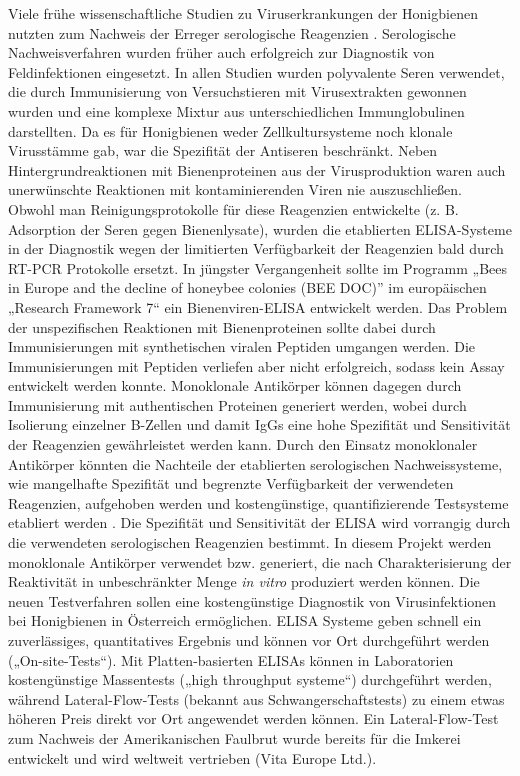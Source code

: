 Viele frühe wissenschaftliche Studien zu Viruserkrankungen der Honigbienen nutzten zum Nachweis der Erreger serologische Reagenzien \citep{Anderson1984}. Serologische Nachweisverfahren wurden früher auch erfolgreich zur Diagnostik von Feldinfektionen eingesetzt. In allen Studien wurden polyvalente Seren verwendet, die durch Immunisierung von Versuchstieren mit Virusextrakten gewonnen wurden und eine komplexe Mixtur aus unterschiedlichen Immunglobulinen darstellten. Da es für Honigbienen weder Zellkultursysteme noch klonale Virusstämme gab, war die Spezifität der Antiseren beschränkt. Neben Hintergrundreaktionen mit Bienenproteinen aus der Virusproduktion waren auch unerwünschte Reaktionen mit kontaminierenden Viren nie auszuschließen. Obwohl man Reinigungsprotokolle für diese Reagenzien entwickelte (z. B. Adsorption der Seren gegen Bienenlysate), wurden die etablierten ELISA-Systeme in der Diagnostik wegen der limitierten Verfügbarkeit der Reagenzien bald durch RT-PCR Protokolle ersetzt. In jüngster Vergangenheit sollte im Programm „Bees in Europe and the decline of honeybee colonies (BEE DOC)” im europäischen „Research Framework 7“ ein Bienenviren-ELISA entwickelt werden. Das Problem der unspezifischen Reaktionen mit Bienenproteinen sollte dabei durch Immunisierungen mit synthetischen viralen Peptiden umgangen werden. Die Immunisierungen mit Peptiden verliefen aber nicht erfolgreich, sodass kein Assay entwickelt werden konnte. Monoklonale Antikörper können dagegen durch Immunisierung mit authentischen Proteinen generiert werden, wobei durch Isolierung einzelner B-Zellen und damit IgGs eine hohe Spezifität und Sensitivität der Reagenzien gewährleistet werden kann. Durch den Einsatz monoklonaler Antikörper könnten die Nachteile der etablierten serologischen Nachweissysteme, wie mangelhafte Spezifität und begrenzte Verfügbarkeit der verwendeten Reagenzien, aufgehoben werden und kostengünstige, quantifizierende Testsysteme etabliert werden \citep{Usuda1999}.
Die Spezifität und Sensitivität der ELISA wird vorrangig durch die verwendeten serologischen Reagenzien bestimmt. In diesem Projekt werden monoklonale Antikörper verwendet bzw. generiert, die nach Charakterisierung der Reaktivität in unbeschränkter Menge \textit{in vitro} produziert werden können. Die neuen Testverfahren sollen eine kostengünstige Diagnostik von Virusinfektionen bei Honigbienen in Österreich ermöglichen. ELISA Systeme geben schnell ein zuverlässiges, quantitatives Ergebnis und können vor Ort durchgeführt werden („On-site-Tests“). Mit Platten-basierten ELISAs können in Laboratorien kostengünstige Massentests („high throughput systeme“) durchgeführt werden, während Lateral-Flow-Tests (bekannt aus Schwangerschaftstests) zu einem etwas höheren Preis direkt vor Ort angewendet werden können. Ein Lateral-Flow-Test zum Nachweis der Amerikanischen Faulbrut wurde bereits für die Imkerei entwickelt und wird weltweit vertrieben (Vita Europe Ltd.).




